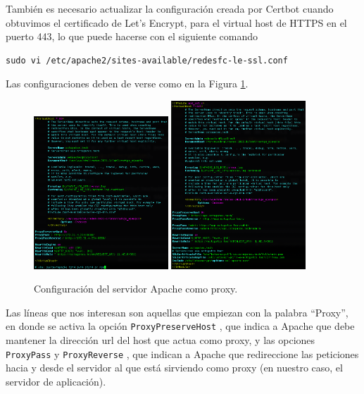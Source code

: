 \documentclass{article}
\newcommand{\ttt}[1]{%
\texttt{#1}%
}
\begin{document}
Tambi\'en es necesario actualizar la configuraci\'on
creada por Certbot cuando obtuvimos el certificado
de Let's Encrypt, para el virtual host de HTTPS en
el puerto 443, lo que puede hacerse con el siguiente
comando
\begin{lstlisting}
sudo vi /etc/apache2/sites-available/redesfc-le-ssl.conf
\end{lstlisting}

Las configuraciones deben de verse como en la
Figura \ref{fig:web-mapache}.
\begin{figure}[H]
  \centering
  \includegraphics[width=0.45\textwidth]{web/mapache80}
  \includegraphics[width=0.45\textwidth]{web/mapache443}
  \caption{Configuraci\'on del servidor Apache como proxy.}
  \label{fig:web-mapache}
\end{figure}

Las l\'ineas que nos interesan son aquellas que empiezan
con la palabra ``Proxy'', en donde se activa la opci\'on
\ttt{ProxyPreserveHost}, que indica a Apache que debe
mantener la direcci\'on url del host que actua como proxy,
y las opciones \ttt{ProxyPass} y \ttt{ProxyReverse}, que
indican a Apache que redireccione las peticiones hacia y
desde el servidor al que est\'a sirviendo como proxy (en
nuestro caso, el servidor de aplicaci\'on).
\end{document}
